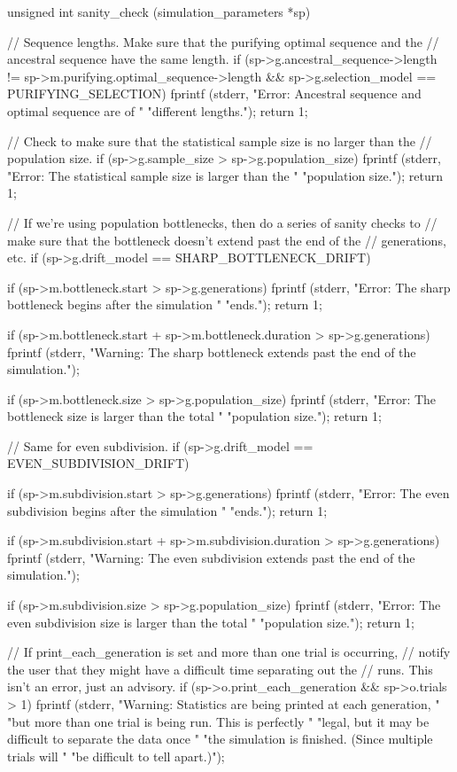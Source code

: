 \documentclass{article}
\begin{document}
\begin{ccode}
unsigned int sanity_check (simulation_parameters *sp) {
  // Sequence lengths. Make sure that the purifying optimal sequence and the
  // ancestral sequence have the same length.
  if (sp->g.ancestral_sequence->length != sp->m.purifying.optimal_sequence->length &&
      sp->g.selection_model == PURIFYING_SELECTION) {
    fprintf (stderr, "Error: Ancestral sequence and optimal sequence are of "
		     "different lengths.\n");
    return 1;
  }

  // Check to make sure that the statistical sample size is no larger than the
  // population size.
  if (sp->g.sample_size > sp->g.population_size) {
    fprintf (stderr, "Error: The statistical sample size is larger than the "
		     "population size.\n");
    return 1;
  }

  // If we're using population bottlenecks, then do a series of sanity checks to
  // make sure that the bottleneck doesn't extend past the end of the
  // generations, etc.
  if (sp->g.drift_model == SHARP_BOTTLENECK_DRIFT) {
    if (sp->m.bottleneck.start > sp->g.generations) {
      fprintf (stderr, "Error: The sharp bottleneck begins after the simulation "
		       "ends.\n");
      return 1;
    }

    if (sp->m.bottleneck.start + sp->m.bottleneck.duration > sp->g.generations)
      fprintf (stderr, "Warning: The sharp bottleneck extends past the end of the simulation.\n");

    if (sp->m.bottleneck.size > sp->g.population_size) {
      fprintf (stderr, "Error: The bottleneck size is larger than the total "
		       "population size.\n");
      return 1;
    }
  }

  // Same for even subdivision.
  if (sp->g.drift_model == EVEN_SUBDIVISION_DRIFT) {
    if (sp->m.subdivision.start > sp->g.generations) {
      fprintf (stderr, "Error: The even subdivision begins after the simulation "
		       "ends.\n");
      return 1;
    }

    if (sp->m.subdivision.start + sp->m.subdivision.duration > sp->g.generations)
      fprintf (stderr, "Warning: The even subdivision extends past the end of the simulation.\n");

    if (sp->m.subdivision.size > sp->g.population_size) {
      fprintf (stderr, "Error: The even subdivision size is larger than the total "
		       "population size.\n");
      return 1;
    }
  }

  // If print_each_generation is set and more than one trial is occurring,
  // notify the user that they might have a difficult time separating out the
  // runs. This isn't an error, just an advisory.
  if (sp->o.print_each_generation && sp->o.trials > 1)
    fprintf (stderr, "Warning: Statistics are being printed at each generation, "
		     "but more than one trial is being run. This is perfectly "
		     "legal, but it may be difficult to separate the data once "
		     "the simulation is finished. (Since multiple trials will "
		     "be difficult to tell apart.)\n");

}
\end{ccode}
\end{document}
